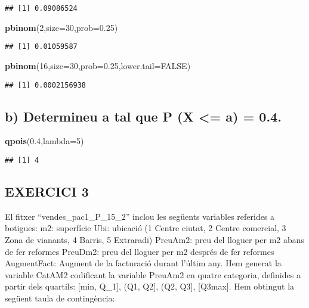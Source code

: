 \documentclass[
]{article}
\newenvironment{Shaded}{\begin{snugshade}}{\end{snugshade}}
\newcommand{\DataTypeTok}[1]{\textcolor[rgb]{0.13,0.29,0.53}{#1}}
\newcommand{\DecValTok}[1]{\textcolor[rgb]{0.00,0.00,0.81}{#1}}
\newcommand{\FloatTok}[1]{\textcolor[rgb]{0.00,0.00,0.81}{#1}}
\newcommand{\KeywordTok}[1]{\textcolor[rgb]{0.13,0.29,0.53}{\textbf{#1}}}
\newcommand{\NormalTok}[1]{#1}
\newcommand{\OtherTok}[1]{\textcolor[rgb]{0.56,0.35,0.01}{#1}}
\begin{document}
\begin{verbatim}
## [1] 0.09086524
\end{verbatim}

\begin{Shaded}
\begin{Highlighting}[]
\KeywordTok{pbinom}\NormalTok{(}\DecValTok{2}\NormalTok{,}\DataTypeTok{size=}\DecValTok{30}\NormalTok{,}\DataTypeTok{prob=}\FloatTok{0.25}\NormalTok{)}
\end{Highlighting}
\end{Shaded}

\begin{verbatim}
## [1] 0.01059587
\end{verbatim}

\begin{Shaded}
\begin{Highlighting}[]
\KeywordTok{pbinom}\NormalTok{(}\DecValTok{16}\NormalTok{,}\DataTypeTok{size=}\DecValTok{30}\NormalTok{,}\DataTypeTok{prob=}\FloatTok{0.25}\NormalTok{,}\DataTypeTok{lower.tail=}\OtherTok{FALSE}\NormalTok{)}
\end{Highlighting}
\end{Shaded}

\begin{verbatim}
## [1] 0.0002156938
\end{verbatim}

\hypertarget{b-determineu-a-tal-que-p-x-a-0.4.}{%
\subsection{b) Determineu a tal que P (X \textless= a) =
0.4.}\label{b-determineu-a-tal-que-p-x-a-0.4.}}

\begin{Shaded}
\begin{Highlighting}[]
\KeywordTok{qpois}\NormalTok{(}\FloatTok{0.4}\NormalTok{,}\DataTypeTok{lambda=}\DecValTok{5}\NormalTok{)}
\end{Highlighting}
\end{Shaded}

\begin{verbatim}
## [1] 4
\end{verbatim}

\hypertarget{exercici-3}{%
\subsection{EXERCICI 3}\label{exercici-3}}

El fitxer ``vendes\_pac1\_P\_15\_2'' inclou les següents variables
referides a botigues: m2: superfície Ubi: ubicació (1 Centre ciutat, 2
Centre comercial, 3 Zona de vianants, 4 Barris, 5 Extraradi) PreuAm2:
preu del lloguer per m2 abans de fer reformes PreuDm2: preu del lloguer
per m2 després de fer reformes AugmentFact: Augment de la facturació
durant l'últim any. Hem generat la variable CatAM2 codificant la
variable PreuAm2 en quatre categoria, definides a partir dels quartils:
{[}min, Q\_1{]}, (Q1, Q2{]}, (Q2, Q3{]}, {[}Q3max{]}. Hem obtingut la
següent taula de contingència:
\end{document}
